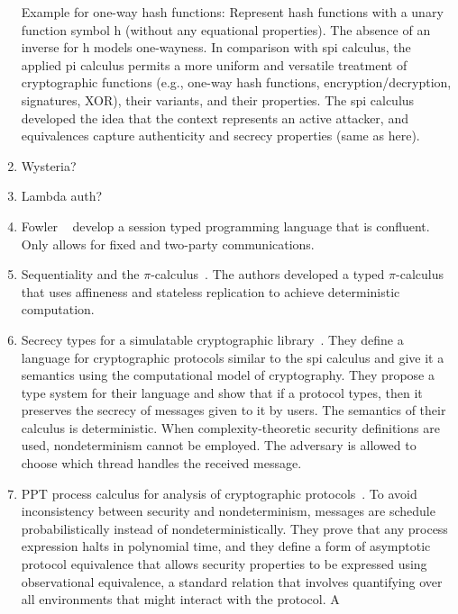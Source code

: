 \begin{enumerate}[leftmargin=*]
    Example for one-way hash functions: Represent hash functions with a unary
    function symbol \textsf{h} (without any equational properties). The absence
    of an inverse for \textsf{h} models one-wayness. In comparison with spi
    calculus, the applied pi calculus permits a more uniform and versatile
    treatment of cryptographic functions (e.g., one-way hash functions,
    encryption/decryption, signatures, XOR), their variants, and their
    properties.  The spi calculus
    developed the idea that the context represents an active attacker, and
    equivalences capture authenticity and secrecy properties (same as here).
  \item Wysteria?~\cite{rastogi2014wysteria}
  \item Lambda auth?~\cite{miller2014authenticated}
  \item Fowler \etal~\cite{fowler2018session} develop a session typed
    programming language that is confluent. Only allows for fixed and two-party
    communications.
  \item Sequentiality and the $\pi$-calculus~\cite{berger2001sequentiality}. The
    authors developed a typed $\pi$-calculus that uses affineness and stateless
    replication to achieve deterministic computation. 
  \item Secrecy types for a simulatable cryptographic
    library~\cite{laud2005secrecy}. They define a language for cryptographic
    protocols similar to the spi calculus and give it a semantics using the
    computational model of cryptography. They propose a type system for their
    language and show that if a protocol types, then it preserves the secrecy of
    messages given to it by users. The semantics of their calculus is
    deterministic. When complexity-theoretic security definitions are used,
    nondeterminism cannot be employed. The adversary is allowed to choose which
    thread handles the received message. 
  \item PPT process calculus for analysis of cryptographic
    protocols~\cite{mitchell2006probabilistic, lincoln1998probabilistic}. To
    avoid inconsistency between security and nondeterminism, messages are
    schedule probabilistically instead of nondeterministically. They prove that
    any process expression halts in polynomial time, and they define a form of
    asymptotic protocol equivalence that allows security properties to be
    expressed using observational equivalence, a standard relation that involves
    quantifying over all environments that might interact with the protocol. A

\end{enumerate}
